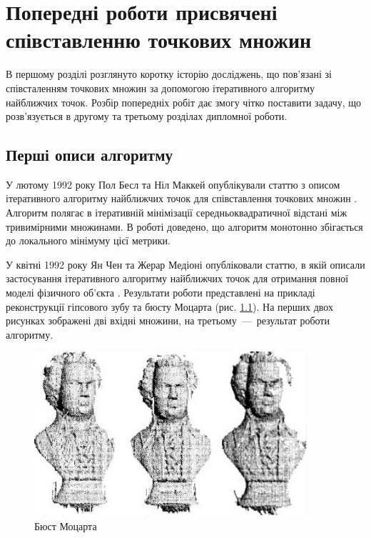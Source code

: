 \chapter{Попередні роботи присвячені співставленню точкових множин}

В першому розділі розглянуто коротку історію досліджень,
що пов'язані зі співсталенням точкових множин
за допомогою ітеративного алгоритму найближчих точок.
Розбір попередніх робіт дає змогу чітко поставити задачу,
що розв'язується в другому та третьому розділах дипломної роботи.

\section{Перші описи алгоритму}

У лютому 1992 року Пол Бесл та Ніл Маккей опублікували статтю з описом
ітеративного алгоритму найближчих точок для співставлення точкових множин
\cite{besl:mckey}.
Алгоритм полягає в ітеративній мінімізації середньоквадратичної відстані між
тривимірними множинами.
В роботі доведено, що алгоритм монотонно збігається до локального мінімуму цієї
метрики.

У квітні 1992 року Ян Чен та Жерар Медіоні опубліковали статтю,
в якій описали застосування ітеративного алгоритму найближчих точок
для отримання повної моделі фізичного об'єкта \cite{chen:medioni}.
Результати роботи представлені на прикладі реконструкції гіпсового зубу та
бюсту Моцарта (рис. \ref{fig:mozart}).
На перших двох рисунках зображені дві вхідні множини,
на третьому~---~результат роботи алгоритму.

\begin{figure}[h]
  \centering
    \includegraphics[width=0.9\textwidth]{images/mozart}
  \caption{Бюст Моцарта}
  \label{fig:mozart}
\end{figure}

